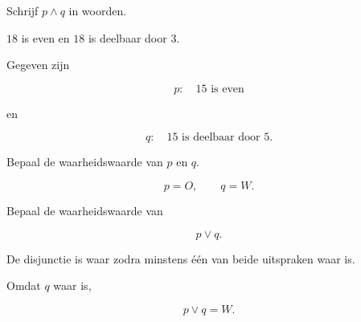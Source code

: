 \documentclass{ximera}
\begin{document}
\begin{oefening}[En: de conjunctie]{\oefB \ESS}
\begin{question}
Schrijf $p\land q$ in woorden.

\begin{oplossing}

\begin{center}

$18$ is even en $18$ is deelbaar door $3$.

\end{center}

\end{oplossing}

\end{question}

\end{oefening}





\begin{oefening}[Of: de disjunctie]{\oefB \ESS}

Gegeven zijn

\[
p:\quad 15\text{ is even}
\]

en

\[
q:\quad 15\text{ is deelbaar door }5.
\]

\begin{question}

Bepaal de waarheidswaarde van $p$ en $q$.

\begin{oplossing}

\[
p=O,
\qquad
q=W.
\]

\end{oplossing}

\end{question}



\begin{question}

Bepaal de waarheidswaarde van

\[
p\lor q.
\]

\begin{oplossing}

De disjunctie is waar zodra minstens één van beide uitspraken waar is.

Omdat $q$ waar is,

\[
p\lor q=W.
\]

\end{oplossing}

\end{question}



\begin{question}


\end{question}
\end{oefening}
\end{document}
